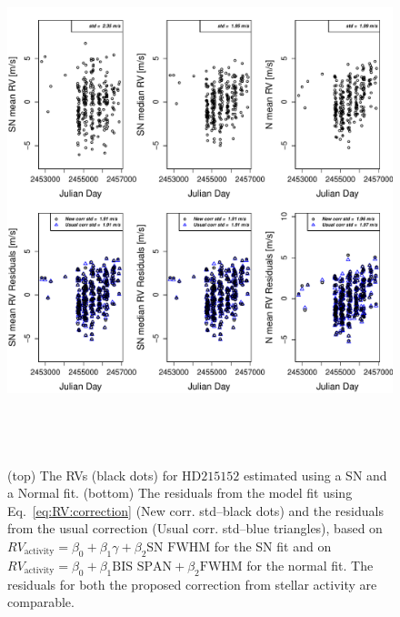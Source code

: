 \documentclass{aa}
\begin{document}
\begin{figure} 
\begin{center}
\includegraphics[height = 6in]{NEW_CORRECTIONHD21515_[3]CorrectionActivity_RadialVelocity_vs_time.pdf} 
   \caption{(top) The RVs (black dots) for $\text{HD}215152$ estimated using a SN and a Normal fit.
 (bottom) The residuals from the model fit using Eq.~\eqref{eq:RV:correction} (New corr. std--black dots) and the residuals from the usual correction (Usual corr. std--blue triangles), based on $RV_{\text{activity}}=\beta_0+\beta_1 \gamma + \beta_2 \text{SN FWHM}$ for the SN fit and on $RV_{\text{activity}}=\beta_0+\beta_1 \text{BIS SPAN} + \beta_2 \text{FWHM}$ for the normal fit. The residuals for both the proposed correction from stellar activity are comparable.}
   \label{fig:HD215152:correctionRV}
\end{center}
\end{figure}
\end{document}
